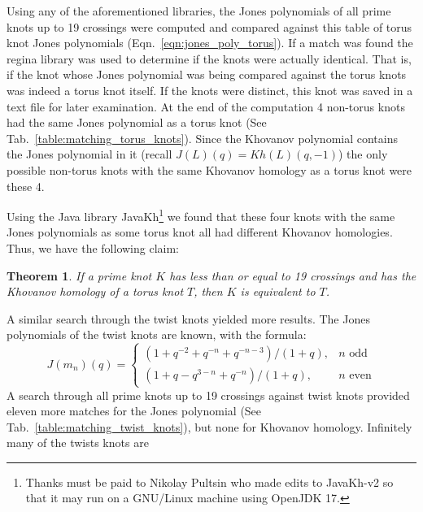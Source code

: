 \documentclass{article}
\theoremstyle{plain}
\newtheorem{theorem}{Theorem}
\begin{document}
        Using any of the aforementioned libraries, the Jones polynomials of all
        prime knots up to 19 crossings were computed and compared against this
        table of torus knot Jones polynomials (Eqn.~\ref{eqn:jones_poly_torus}).
        If a match was found the regina library was used to determine if the
        knots were actually identical. That is, if the knot whose Jones
        polynomial was being compared against the torus knots was indeed a
        torus knot itself. If the knots were distinct, this knot was saved in a
        text file for later examination. At the end of the computation 4
        non-torus knots had the same Jones polynomial as a torus knot
        (See Tab.~\ref{table:matching_torus_knots}).
        Since the Khovanov polynomial contains the Jones polynomial in it
        (recall $J(L)(q)=Kh(L)(q,-1)$) the only possible non-torus knots with
        the same Khovanov homology as a torus knot were these 4.
        \par\hfill\par
        Using the Java library JavaKh\footnote{%
            Thanks must be paid to Nikolay Pultsin who made edits to
            JavaKh-v2 so that it may run on a GNU/Linux machine using
            OpenJDK 17.
        }
        we found that these four knots with the same Jones polynomials as some
        torus knot all had different Khovanov homologies. Thus, we have the
        following claim:
        \begin{theorem}
            If a prime knot $K$ has less than or equal to 19 crossings and has
            the Khovanov homology of a torus knot $T$,
            then $K$ is equivalent to $T$.
        \end{theorem}
        A similar search through the twist knots yielded more results.
        The Jones polynomials of the twist knots are known, with the formula:
        \begin{equation}
            J(m_{n})(q)=
            \begin{cases}
                (1+q^{-2}+q^{-n}+q^{-n-3})/(1+q),&n\textrm{ odd}\\
                (1+q-q^{3-n}+q^{-n})/(1+q),&n\textrm{ even}
            \end{cases}
        \end{equation}
        A search through all prime knots up to 19 crossings against twist knots
        provided eleven more matches for the Jones polynomial
        (See Tab.~\ref{table:matching_twist_knots}), but
        none for Khovanov homology. Infinitely many of the twists knots are
\end{document}
